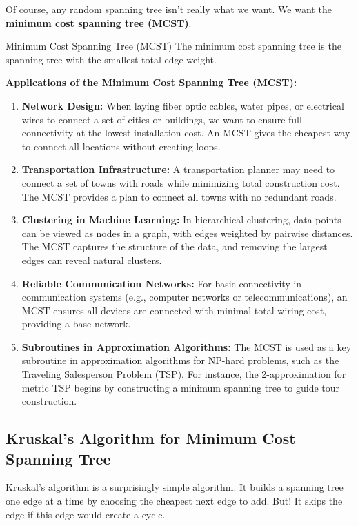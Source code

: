Of course, any random spanning tree isn't really what we want.  We want the \textbf{minimum cost spanning tree (MCST)}.

\begin{definition}{Minimum Cost Spanning Tree (MCST)}
The minimum cost spanning tree is the spanning tree with the smallest total edge weight.  
\end{definition}

\textbf{Applications of the Minimum Cost Spanning Tree (MCST):}
\begin{enumerate}
    \item \textbf{Network Design:} When laying fiber optic cables, water pipes, or electrical wires to connect a set of cities or buildings, we want to ensure full connectivity at the lowest installation cost. An MCST gives the cheapest way to connect all locations without creating loops.

    \item \textbf{Transportation Infrastructure:} A transportation planner may need to connect a set of towns with roads while minimizing total construction cost. The MCST provides a plan to connect all towns with no redundant roads.

    \item \textbf{Clustering in Machine Learning:} In hierarchical clustering, data points can be viewed as nodes in a graph, with edges weighted by pairwise distances. The MCST captures the structure of the data, and removing the largest edges can reveal natural clusters.

    \item \textbf{Reliable Communication Networks:} For basic connectivity in communication systems (e.g., computer networks or telecommunications), an MCST ensures all devices are connected with minimal total wiring cost, providing a base network.

    \item \textbf{Subroutines in Approximation Algorithms:} The MCST is used as a key subroutine in approximation algorithms for NP-hard problems, such as the Traveling Salesperson Problem (TSP). For instance, the 2-approximation for metric TSP begins by constructing a minimum spanning tree to guide tour construction.
\end{enumerate}

\subsection{Kruskal's Algorithm for Minimum Cost Spanning Tree}
\label{subsec:gt-kruskal}
Kruskal's algorithm is a surprisingly simple algorithm.  It builds a spanning tree one edge at a time by choosing the cheapest next edge to add.  But!  It skips the edge if this edge would create a cycle.

